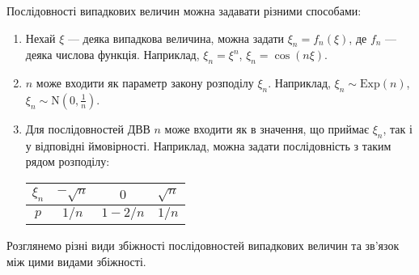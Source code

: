 Послідовності випадкових величин можна задавати різними способами:
\begin{enumerate}
    \item Нехай $\xi$ --- деяка випадкова величина, можна задати $\xi_n = f_n(\xi)$, де $f_n$ --- деяка числова функція. 
    Наприклад, $\xi_n = \xi^n$, $\xi_n = \cos (n\xi)$.
    \item $n$ може входити як параметр закону розподілу $\xi_n$. Наприклад, $\xi_n \sim \mathrm{Exp}(n)$, $\xi_n \sim \mathrm{N}(0, \frac{1}{n})$.
    \item Для послідовностей ДВВ $n$ може входити як в значення, що приймає $\xi_n$, так і у відповідні ймовірності. Наприклад, можна задати
    послідовність з таким рядом розподілу:
    \begin{center}
        \begin{tabular}{|c|c|c|c|}
            \hline
            $\xi_n$ & $-\sqrt{n}$ & $0$ & $\sqrt{n}$ \\
            \hline
            $p$ & $1/n$ & $1 - 2/n$ & $1/n$ \\
            \hline
        \end{tabular}
    \end{center}
\end{enumerate}
Розглянемо різні види збіжності послідовностей випадкових величин та
зв'язок між цими видами збіжності.

